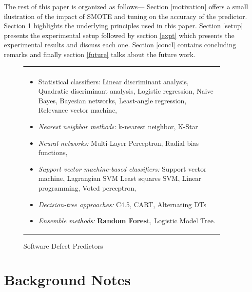 \documentclass[12pt]{IEEEtran}
\begin{document}
The rest of this paper is organized as follows--- Section \ref*{motivation} offers a small ilustration of the impact of SMOTE and tuning on the accuracy of the predictor. Section \ref*{back} highlights the underlying principles used in this paper. Section \ref{setup} presents the experimental setup followed by section \ref{expt} which presents the experimental results and discuss each one. Section \ref{concl} contains concluding remarks and finally section \ref{future} talks about the future work.\\[-1cm]

\begin{figure}[tbp!]
	
	{\footnotesize 
		\begin{tabular}{|p{0.95\linewidth}|}\hline\\[-0.3cm]
			\rowcolor[HTML]{FFFFFF}
			\begin{itemize}
				\item Statistical classifiers:
				Linear    discriminant analysis,
				Quadratic discriminant analysis,
				Logistic regression,
				Naive Bayes,
				Bayesian networks,
				Least-angle regression,
				Relevance vector machine,
				
				\item \textit{Nearest neighbor methods:} k-nearest neighbor, K-Star
				
				\item {\em Neural networks:} Multi-Layer Perceptron, Radial bias functions,
				
				\item \textit{Support vector machine-based classifiers:}
				Support vector machine,
				Lagrangian SVM
				Least squares SVM,
				Linear programming,
				Voted perceptron,
				
				\item \textit{Decision-tree approaches:}
				C4.5,
				CART,
				Alternating DTs
				\item \textit{Ensemble methods:}
				\textbf{Random Forest},
				Logistic Model Tree.
			\end{itemize}\\\hline
		\end{tabular}}
		\caption{Software Defect Predictors}\label{fig:lessmann}
	\end{figure}


\section{Background Notes}
\label{back}
\end{document}
